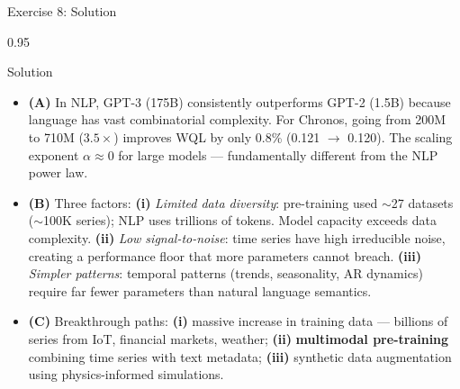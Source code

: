 \documentclass[9pt, aspectratio=169, t]{beamer}
\begin{document}
\begin{frame}{Exercise 8: Solution}
    \begin{cminipage}{0.95\textwidth}
    \begin{exampleblock}{Solution}
        {\footnotesize
        \begin{itemize}\setlength{\itemsep}{1pt}
            \item \textcolor{MainBlue}{\textbf{(A)}} In NLP, GPT-3 (175B) consistently outperforms GPT-2 (1.5B) because language has vast combinatorial complexity. For Chronos, going from 200M to 710M ($3.5\times$) improves WQL by only 0.8\% (0.121 $\to$ 0.120). The scaling exponent $\alpha \approx 0$ for large models --- fundamentally different from the NLP power law.
            \item \textcolor{MainBlue}{\textbf{(B)}} Three factors: \textbf{(i)} \textit{Limited data diversity}: pre-training used $\sim$27 datasets ($\sim$100K series); NLP uses trillions of tokens. Model capacity exceeds data complexity. \textbf{(ii)} \textit{Low signal-to-noise}: time series have high irreducible noise, creating a performance floor that more parameters cannot breach. \textbf{(iii)} \textit{Simpler patterns}: temporal patterns (trends, seasonality, AR dynamics) require far fewer parameters than natural language semantics.
            \item \textcolor{MainBlue}{\textbf{(C)}} Breakthrough paths: \textbf{(i)} massive increase in training data --- billions of series from IoT, financial markets, weather; \textbf{(ii)} \textbf{multimodal pre-training} combining time series with text metadata; \textbf{(iii)} synthetic data augmentation using physics-informed simulations.
        \end{itemize}
        }
    \end{exampleblock}
    \end{cminipage}
\end{frame}
\end{document}
